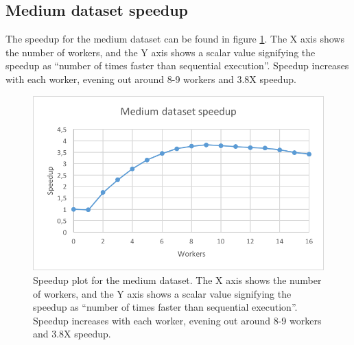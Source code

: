 \subsection{Medium dataset speedup}
The speedup for the medium dataset can be found in figure \ref{fig:dataset_3_speedup}.
The X axis shows the number of workers, and the Y axis shows a scalar value signifying the speedup as
``number of times faster than sequential execution''. Speedup increases with each worker, evening out around 8-9 workers and 3.8X speedup.
\begin{figure}[ht]
  \centering
  \includegraphics[width=120mm]{figures/dataset_3/dataset_3_speedup.png}
  \caption[Speedup plot for the medium dataset.]{Speedup plot for the medium dataset. The X axis shows the number of workers, and the Y axis shows a scalar value signifying the speedup as
  ``number of times faster than sequential execution''. Speedup increases with each worker, evening out around 8-9 workers and 3.8X speedup.}
  \label{fig:dataset_3_speedup}
\end{figure}


